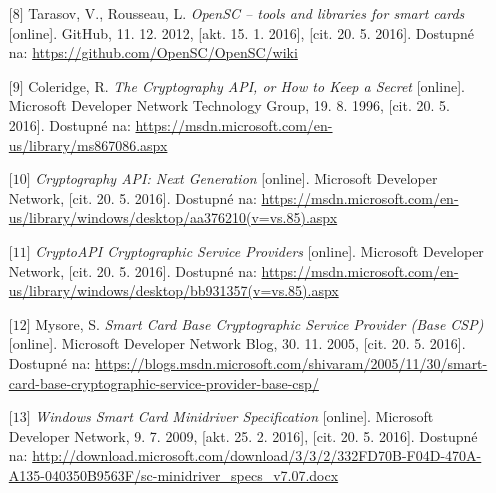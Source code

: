 \documentclass[]{fithesis3}
\begin{document}
{\begin{itemize}
	\item[$\mbox{[8]}$]Tarasov, V., Rousseau, L. \textit{OpenSC – tools and libraries for smart cards} [online]. GitHub, 11. 12. 2012, [akt. 15. 1. 2016], [cit. 20. 5. 2016]. Dostupné na: \url{https://github.com/OpenSC/OpenSC/wiki}

	\item[$\mbox{[9]}$] Coleridge, R. \textit{The Cryptography API, or How to Keep a Secret} [online]. Microsoft Developer Network Technology Group, 19. 8. 1996, [cit. 20. 5. 2016]. Dostupné na: \url{https://msdn.microsoft.com/en-us/library/ms867086.aspx}

	\item[$\mbox{[10]}$] \textit{Cryptography API: Next Generation} [online]. Microsoft Developer Network, [cit. 20. 5. 2016]. Dostupné na: \url{https://msdn.microsoft.com/en-us/library/windows/desktop/aa376210(v=vs.85).aspx}

	\item[$\mbox{[11]}$] \textit{CryptoAPI Cryptographic Service Providers} [online]. Microsoft Developer Network, [cit. 20. 5. 2016]. Dostupné na: \url{https://msdn.microsoft.com/en-us/library/windows/desktop/bb931357(v=vs.85).aspx}

	\item[$\mbox{[12]}$] Mysore, S. \textit{Smart Card Base Cryptographic Service Provider (Base CSP)} [online]. Microsoft Developer Network Blog, 30. 11. 2005, [cit. 20. 5. 2016]. Dostupné na: \url{https://blogs.msdn.microsoft.com/shivaram/2005/11/30/smart-card-base-cryptographic-service-provider-base-csp/}

	\item[$\mbox{[13]}$] \textit{Windows Smart Card Minidriver Specification} [online]. Microsoft Developer Network, 9. 7. 2009, [akt. 25. 2. 2016], [cit. 20. 5. 2016]. Dostupné na: \url{http://download.microsoft.com/download/3/3/2/332FD70B-F04D-470A-A135-040350B9563F/sc-minidriver_specs_v7.07.docx}
\end{itemize}
}


\appendix %
\end{document}
